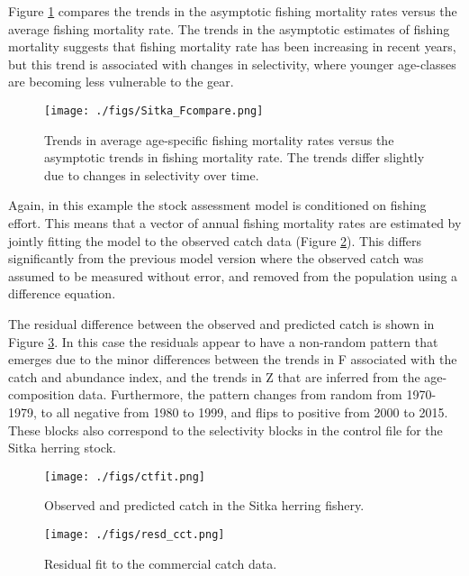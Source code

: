 \documentclass[12pt,letterpaper]{article}
\begin{document}
  Figure \ref{fig:Fcompare} compares the trends in the asymptotic fishing mortality rates versus the average fishing mortality rate.  The trends in the asymptotic estimates of fishing mortality suggests that fishing mortality rate has been increasing in recent years, but this trend is associated with changes in selectivity, where younger age-classes are becoming less vulnerable to the gear.  

  \begin{figure}[tb]
    \centering
    \texttt{[image: ./figs/Sitka\_Fcompare.png]}
    \caption{Trends in average age-specific fishing mortality rates versus the asymptotic trends in fishing mortality rate. The trends differ slightly due to changes in selectivity over time.}
    \label{fig:Fcompare}
  \end{figure}

  Again, in this example the stock assessment model is conditioned on fishing effort. This means that a vector of annual fishing mortality rates are estimated by jointly fitting the model to the observed catch data (Figure \ref{fig:ctfit}).  This differs significantly from the previous model version where the observed catch was assumed to be measured without error, and removed from the population using a difference equation. 

  The residual difference between the observed and predicted catch is shown in Figure \ref{fig:resd_cct}.  In this case the residuals appear to have a non-random pattern that emerges due to the minor differences between the trends in F associated with the catch and abundance index, and the trends in Z that are inferred from the age-composition data.  Furthermore, the pattern changes from random from 1970-1979, to all negative from 1980 to 1999, and flips to positive from 2000 to 2015.  These blocks also correspond to the selectivity blocks in the control file for the Sitka herring stock.

  \begin{figure}[tb]
    \centering
    \texttt{[image: ./figs/ctfit.png]}
    \caption{Observed and predicted catch in the Sitka herring fishery.}
    \label{fig:ctfit}
  \end{figure}

  \begin{figure}[tb]
    \centering
    \texttt{[image: ./figs/resd\_cct.png]}
    \caption{Residual fit to the commercial catch data.}
    \label{fig:resd_cct}
  \end{figure}
\end{document}

